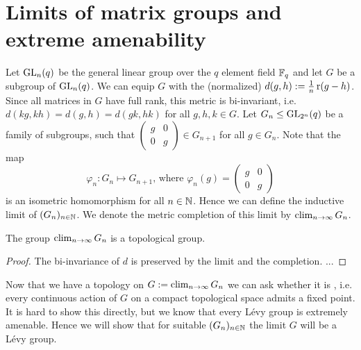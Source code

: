 \section{Limits of matrix groups and extreme amenability}
Let $\operatorname{GL}_n(q)$ be the general linear group over the $q$ element field $\mathbb{F}_q$ and let $G$ be a subgroup of $\operatorname{GL}_n(q)$. We can equip $G$ with the (normalized)  $d(g,h):=\frac{1}{n}\operatorname{r}(g-h)$.
Since all matrices in $G$ have full rank, this metric is bi-invariant, i.e. $d(kg,kh)=d(g,h)=d(gk,hk)$ for all $g,h,k\in G$. 
Let $G_n\leq \operatorname{GL}_{2^n}(q)$ be a family of subgroups, such that 
$\begin{pmatrix}
g &0\\
0&g
\end{pmatrix}\in G_{n+1}$ for all $g\in G_n$. Note that the map
\[\varphi_n\colon G_n\mapsto G_{n+1}\text{, where }\varphi_n(g)=\begin{pmatrix}
g &0\\
0&g
\end{pmatrix}\]
is an isometric homomorphism for all $n\in\mathbb{N}$. Hence we can define the inductive limit of $(G_n)_{n\in\mathbb{N}}$. We denote the metric completion of this limit by $\operatorname{clim}\limits_{n\to\infty} G_n$.%




\begin{lemma}\label{lem:GroupTopo}
The group $\operatorname{clim}\limits_{n\to\infty} G_n$ is a topological group.
\end{lemma}
\begin{proof}
The bi-invariance of $d$ is preserved by the limit and the completion. ... 
\end{proof}

Now that we have a topology on $G:=\operatorname{clim}\limits_{n\to\infty} G_n$ we can ask whether it is , i.e. every continuous action of $G$ on a compact topological space admits a fixed point. It is hard to show this directly, but we know that every L\'evy group is extremely amenable. Hence we will show that for suitable $(G_n)_{n\in\mathbb{N}}$ the limit $G$ will be a L\'evy group.

